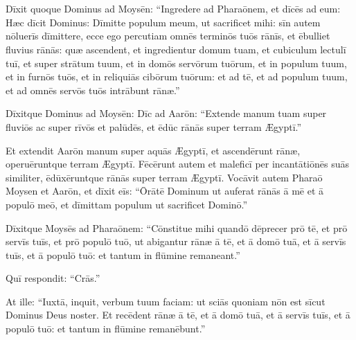 \chapter{}


\thispagestyle{empty}

  Dīxit quoque Dominus ad Moysēn: ``Ingredere 
ad Pharaōnem, et dīcēs ad eum: Hæc dīcit
Dominus: Dīmitte populum meum, ut sacrificet mihi: sīn autem nōluerīs
dīmittere, ecce ego percutiam omnēs terminōs tuōs
rānīs,  et ēbulliet fluvius
rānās: quæ ascendent, et ingredientur domum tuam, et cubiculum lectulī tuī, et super strātum
tuum, et in domōs servōrum tuōrum, et in populum tuum, et in
furnōs tuōs, et in reliquiās cibōrum tuōrum:
et ad tē, et ad populum tuum, et ad omnēs servōs tuōs intrābunt
rānæ.''

Dīxitque Dominus ad Moysēn: Dīc ad
Aarōn: ``Extende manum tuam super fluviōs ac super rīvōs et
palūdēs, et ēdūc rānās super terram Ægyptī.''

Et extendit Aarōn manum super aquās Ægyptī, et ascendērunt
rānæ, operuēruntque terram Ægyptī.  Fēcērunt autem et
maleficī per incantātiōnēs suās similiter, ēdūxēruntque rānās super terram Ægyptī.
Vocāvit autem Pharaō Moysen et Aarōn, et
dīxit eīs: ``Ōrātē Dominum ut auferat rānās ā mē et ā populō
meō, et dīmittam populum ut sacrificet Dominō.''

Dīxitque Moysēs
ad Pharaōnem: ``Cōnstitue mihi quandō
dēprecer prō tē, et prō servīs tuīs, et prō populō tuō, ut
abigantur rānæ ā tē, et ā domō tuā, et ā
servīs tuīs, et ā populō tuō: et tantum in flūmine remaneant.''

Quī respondit: ``Crās.''

At ille: ``Iuxtā, inquit, verbum tuum faciam: ut sciās
quoniam nōn est sīcut Dominus Deus noster.  Et recēdent
rānæ ā tē, et ā domō tuā, et ā servīs tuīs, et ā populō tuō:
et tantum in flūmine remanēbunt.''

